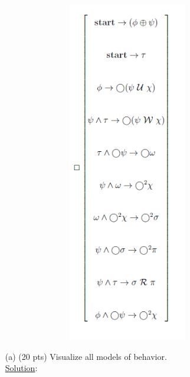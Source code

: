 \documentclass[12pt]{article}
\begin{document}
\begin{enumerate}
\begin{figure}[h!]
\includegraphics[width=0.9\textwidth, height = 15cm, keepaspectratio]{images/Q6.png}
\end{figure}
\newpage
\begin{enumerate}
\item[(a)](20 pts) Visualize all models of behavior. \\
\noindent \underline{Solution}:\\ \\
\begin{minipage}{\linewidth}
   \centering

\end{minipage}
\end{enumerate}
\end{enumerate}
\end{document}
